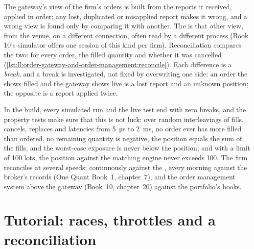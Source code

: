 The gateway's view of the firm's orders is built from the reports it received, applied in order; any lost, duplicated or
misapplied report makes it wrong, and a wrong view is found only by comparing it with another. The  is that other
view, from the venue, on a different connection, often read by a different process (Book 10's simulator offers one session of
this kind per firm). Reconciliation compares the two: for every order, the filled quantity and whether it was cancelled
(\cref{lst:ll:order-gateway-and-order-management:reconcile}). Each difference is a \emph{break}, and a break is investigated,
not fixed by overwriting one side: an order the  shows filled and the gateway shows live is a lost report and an
unknown position; the opposite is a report applied twice.

\label{lst:ll:order-gateway-and-order-management:reconcile}

In the build, every simulated run and the live test end with zero breaks, and the property tests make sure that this is not
luck: over random interleavings of fills, cancels, replaces and latencies from \qty{5}{\micro\second} to \qty{2}{\milli\second},
no order ever has more filled than ordered, no remaining quantity is negative, the position equals the sum of the fills, and
the worst-case exposure is never below the position; and with a limit of 100 lots, the position against the matching engine
never exceeds 100. The firm reconciles at several speeds: continuously against the , every morning against
the broker's records (One Quant Book~1, chapter~7), and the order management system above the gateway (Book~10,
chapter~20) against the portfolio's books.

\section{Tutorial: races, throttles and a reconciliation}\label{tut:ll:order-gateway-and-order-management:tut}

